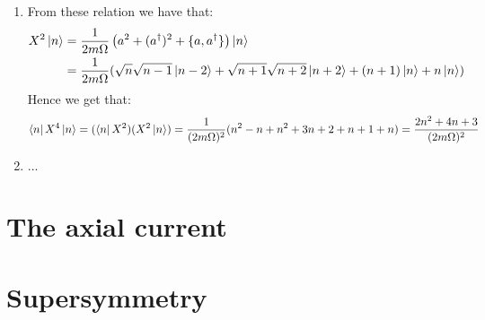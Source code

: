 \documentclass[10pt,a4paper]{article}
\begin{document}
\begin{enumerate}


\item From these relation we have that:
\begin{align*}
X^2 \ket{n} &= \frac{1}{2 m \Omega} \left( a^2 + (a^\dagger)^2 + \{a, a^\dagger\} \right)\ket{n} \\
&= \frac{1}{2m \Omega} (\sqrt{n}\sqrt{n-1} \ket{n-2} + \sqrt{n+1}\sqrt{n+2} \ket{n+2} + (n+1)\ket{n} + n\ket{n})
\end{align*}
Hence we get that:
\[
\bra{n} X^4 \ket{n} = (\bra{n} X^2)(X^2 \ket{n}) = \frac{1}{(2 m \Omega)^2} (n^2 - n + n^2 + 3n + 2 + n + 1 + n) = \frac{2n^2 + 4n + 3}{(2m \Omega)^2}
\]

\item ...

\end{enumerate}

\section{The axial current}

\section{Supersymmetry}
\end{document}
